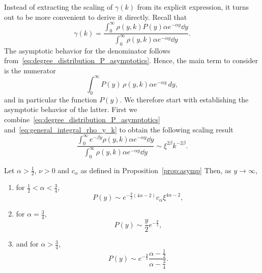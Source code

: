 Instead of extracting the scaling of $\gamma(k)$ from its explicit expression, it turns out to be more convenient to derive it directly. Recall that
\[
	\gamma(k) = \frac{\int_0^\infty \rho(y,k) P(y) \alpha e^{-\alpha y} \dd y}{\int_0^\infty \rho(y,k) \alpha e^{-\alpha y} \dd y}.
\]
The asymptotic behavior for the denominator follows from~\eqref{eq:degree_distribution_P_asymptotics}. Hence, the main term to consider is the numerator
\[
	\int_0^{\infty} P(y) \, \rho(y,k) \alpha e^{-\alpha y} \, dy,
\]
and in particular the function $P(y)$. We therefore start with establishing the asymptotic behavior of the latter. First we combine~\eqref{eq:degree_distribution_P_asymptotics} and~\eqref{eq:general_integral_rho_y_k} to obtain the following scaling result
\begin{equation}\label{eq:general_clustering_integral_scaling}
	\frac{\int_0^\infty e^{-\beta y} \rho(y,k) \alpha e^{-\alpha y} \dd y}
	{\int_0^\infty \rho(y,k) \alpha e^{-\alpha y} \dd y}
	\sim \xi^{2\beta} k^{-2\beta}.
\end{equation}



\begin{proposition}\label{prop:asymptotics_P}
Let $\alpha > \frac{1}{2}$, $\nu > 0$ and $c_\alpha$ as defined in Proposition~\ref{prop:asymp} Then, as $y \to \infty$, 
\begin{enumerate}
\item for $\frac{1}{2} < \alpha < \frac{3}{4}$,
\[
	P(y) \sim e^{-\frac{y}{2}(4\alpha - 2)} c_\alpha \xi^{4\alpha - 2},
\]
\item for $\alpha = \frac{3}{4}$,
\[
	P(y) \sim \frac{y}{2} e^{-\frac{y}{2}},
\]
\item and for $\alpha > \frac{3}{4}$,
\[
	P(y) \sim e^{-\frac{y}{2}} \frac{\alpha - \frac{1}{2}}{\alpha - \frac{3}{4}}.
\]
\end{enumerate}
\end{proposition}

